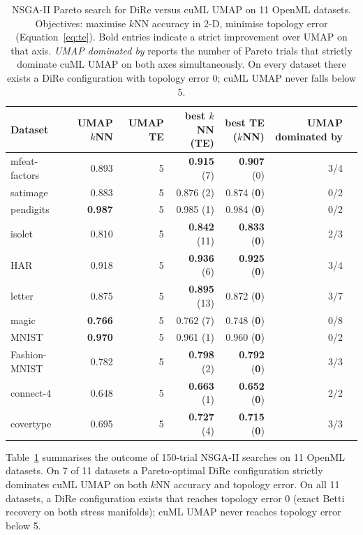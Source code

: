 \documentclass[9pt,twocolumn,twoside]{pnas-new}
\begin{document}
\begin{table}[t]
\centering
\small
\begin{tabular}{@{}lrrrrrr@{}}
\toprule
Dataset & UMAP $k$NN & UMAP TE & best $k$NN (TE) & best TE ($k$NN) & UMAP dominated by \\
\midrule
mfeat-factors   & 0.893 & 5 & \textbf{0.915} (7) & \textbf{0.907} (0) & 3/4 \\
satimage        & 0.883 & 5 & 0.876 (2) & 0.874 (\textbf{0}) & 0/2 \\
pendigits       & \textbf{0.987} & 5 & 0.985 (1) & 0.984 (\textbf{0}) & 0/2 \\
isolet          & 0.810 & 5 & \textbf{0.842} (11) & \textbf{0.833} (\textbf{0}) & 2/3 \\
HAR             & 0.918 & 5 & \textbf{0.936} (6) & \textbf{0.925} (\textbf{0}) & 3/4 \\
letter          & 0.875 & 5 & \textbf{0.895} (13) & 0.872 (\textbf{0}) & 3/7 \\
magic           & \textbf{0.766} & 5 & 0.762 (7) & 0.748 (\textbf{0}) & 0/8 \\
MNIST           & \textbf{0.970} & 5 & 0.961 (1) & 0.960 (\textbf{0}) & 0/2 \\
Fashion-MNIST   & 0.782 & 5 & \textbf{0.798} (2) & \textbf{0.792} (\textbf{0}) & 3/3 \\
connect-4       & 0.648 & 5 & \textbf{0.663} (1) & \textbf{0.652} (\textbf{0}) & 2/2 \\
covertype       & 0.695 & 5 & \textbf{0.727} (4) & \textbf{0.715} (\textbf{0}) & 3/3 \\
\bottomrule
\end{tabular}
\caption{NSGA-II Pareto search for DiRe versus cuML UMAP on 11 OpenML
datasets. Objectives: maximise $k$NN accuracy in 2-D, minimise topology
error (Equation~\ref{eq:te}). Bold entries indicate a strict improvement
over UMAP on that axis. \emph{UMAP dominated by} reports the number of
Pareto trials that strictly dominate cuML UMAP on both axes
simultaneously. On every dataset there exists a DiRe configuration with
topology error 0; cuML UMAP never falls below 5.}
\label{tab:pareto}
\end{table}

Table~\ref{tab:pareto} summarises the outcome of 150-trial NSGA-II
searches on 11 OpenML datasets. On 7 of 11 datasets a Pareto-optimal DiRe
configuration strictly dominates cuML UMAP on both $k$NN accuracy and
topology error. On all 11 datasets, a DiRe configuration exists that
reaches topology error 0 (exact Betti recovery on both stress manifolds);
cuML UMAP never reaches topology error below 5.
\end{document}
